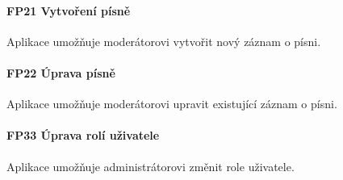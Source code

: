 \noindent \begin{minipage}{\textwidth}
    \paragraph{FP21 Vytvoření písně} \label{FP21}
    \begin{smallindent}{}
        Aplikace umožňuje moderátorovi vytvořit nový záznam o písni.
    \end{smallindent}
\end{minipage}

\noindent \begin{minipage}{\textwidth}
    \paragraph{FP22 Úprava písně} \label{FP22}
    \begin{smallindent}{}
        Aplikace umožňuje moderátorovi upravit existující záznam o písni.
    \end{smallindent}
\end{minipage}

\noindent \begin{minipage}{\textwidth}
    \paragraph{FP33 Úprava rolí uživatele} \label{FP33}
    \begin{smallindent}{}
        Aplikace umožňuje administrátorovi změnit role uživatele.
    \end{smallindent}
\end{minipage}

